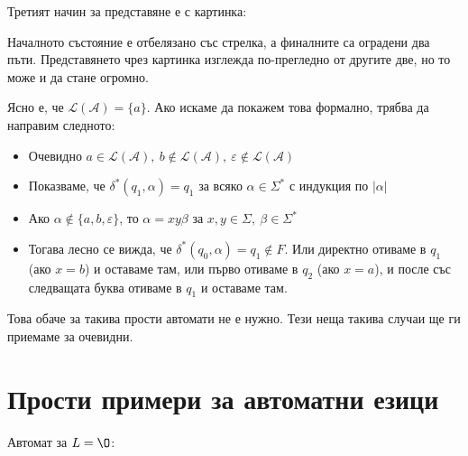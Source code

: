 Третият начин за представяне е с картинка:

\begin{center}
\end{center}

Началното състояние е отбелязано със стрелка, а финалните са оградени два пъти.
Представянето чрез картинка изглежда по-прегледно от другите две, но то може и да стане огромно.

Ясно е, че $\mathcal{L}(\mathcal{A}) = \{ a \}$.
Ако искаме да покажем това формално, трябва да направим следното:
\begin{itemize}
    \item Очевидно $a \in \mathcal{L}(\mathcal{A}), \: b \notin \mathcal{L}(\mathcal{A}), \: \varepsilon \notin \mathcal{L}(\mathcal{A})$
    \item Показваме, че $\delta^*(q_1, \alpha) = q_1$ за всяко $\alpha \in \Sigma^*$ с индукция по $|\alpha|$
    \item Ако $\alpha \notin \{ a, b, \varepsilon \}$, то $\alpha = x y \beta$ за $x, y \in \Sigma, \: \beta \in \Sigma^*$
    \item Тогава лесно се вижда, че $\delta^*(q_0, \alpha) = q_1 \notin F$.
          Или директно отиваме в $q_1$ (ако $x = b$) и оставаме там, или първо отиваме в $q_2$ (ако $x = a$), и после със следващата буква отиваме в $q_1$ и оставаме там.
\end{itemize}

Това обаче за такива прости автомати не е нужно.
Тези неща такива случаи ще ги приемаме за очевидни.

\section{Прости примери за автоматни езици}

Автомат за $L = \O$:

\begin{center}
\end{center}

